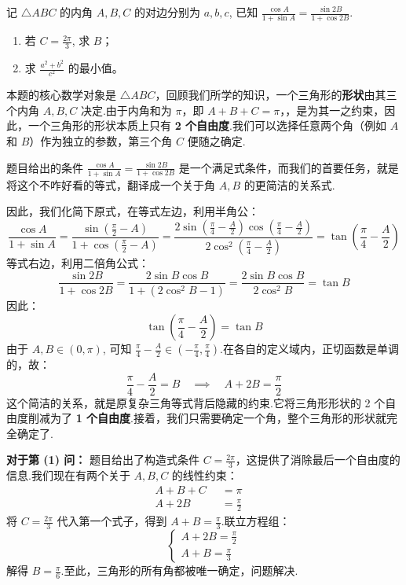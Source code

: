 \begin{prob}[source={2022 年全国新高考 I 卷第 18 题}, topic={取值范围}]
记 $\triangle ABC$ 的内角 $A,B,C$ 的对边分别为 $a,b,c$, 已知 $\frac{\cos A}{1+\sin A} = \frac{\sin 2B}{1+\cos 2B}$.
\begin{enumerate}
	\item[(1)] 若 $C = \frac{2\pi}{3}$, 求 $B$；
	\item[(2)] 求 $\frac{a^2+b^2}{c^2}$ 的最小值。
\end{enumerate}
\end{prob}
\begin{prob-sol}
本题的核心数学对象是 $\triangle ABC$，回顾我们所学的知识，一个三角形的\textbf{形状}由其三个内角 $A, B, C$ 决定.由于内角和为 $\pi$，即 $A+B+C=\pi$，，是为其一之约束，因此，一个三角形的形状本质上只有 \textbf{2 个自由度}.我们可以选择任意两个角（例如 $A$ 和 $B$）作为独立的参数，第三个角 $C$ 便随之确定.

题目给出的条件 $\frac{\cos A}{1+\sin A} = \frac{\sin 2B}{1+\cos 2B}$ 是一个满足式条件，而我们的首要任务，就是将这个不咋好看的等式，翻译成一个关于角 $A, B$ 的更简洁的关系式.

因此，我们化简下原式，在等式左边，利用半角公：
\[
\frac{\cos A}{1+\sin A} = \frac{\sin(\frac{\pi}{2}-A)}{1+\cos(\frac{\pi}{2}-A)} = \frac{2\sin(\frac{\pi}{4}-\frac{A}{2})\cos(\frac{\pi}{4}-\frac{A}{2})}{2\cos^2(\frac{\pi}{4}-\frac{A}{2})} = \tan\left(\frac{\pi}{4}-\frac{A}{2}\right)
\]
等式右边，利用二倍角公式：
\[
\frac{\sin 2B}{1+\cos 2B} = \frac{2\sin B \cos B}{1+(2\cos^2 B-1)} = \frac{2\sin B \cos B}{2\cos^2 B} = \tan B
\]
因此：
\[
\tan\left(\frac{\pi}{4}-\frac{A}{2}\right) = \tan B
\]
由于 $A, B \in (0, \pi)$, 可知 $\frac{\pi}{4}-\frac{A}{2} \in (-\frac{\pi}{4}, \frac{\pi}{4})$.在各自的定义域内，正切函数是单调的，故：
\[
\frac{\pi}{4}-\frac{A}{2} = B \quad \implies \quad A+2B = \frac{\pi}{2}
\]
这个简洁的关系，就是原复杂三角等式背后隐藏的约束.它将三角形形状的 2 个自由度削减为了 \textbf{1 个自由度}.接着，我们只需要确定一个角，整个三角形的形状就完全确定了.

\textbf{对于第 (1) 问：}
题目给出了构造式条件 $C = \frac{2\pi}{3}$，这提供了消除最后一个自由度的信息.我们现在有两个关于 $A, B, C$ 的线性约束：
\begin{align*}
	A+B+C &= \pi \quad  \\
	A+2B \qquad &= \frac{\pi}{2} \quad
\end{align*}
将 $C=\frac{2\pi}{3}$ 代入第一个式子，得到 $A+B = \frac{\pi}{3}$.联立方程组：
\[
\begin{cases}
	A+2B = \frac{\pi}{2} \\
	A+B = \frac{\pi}{3}
\end{cases}
\]
解得 $B = \frac{\pi}{6}$.至此，三角形的所有角都被唯一确定，问题解决.


\end{prob-sol}
